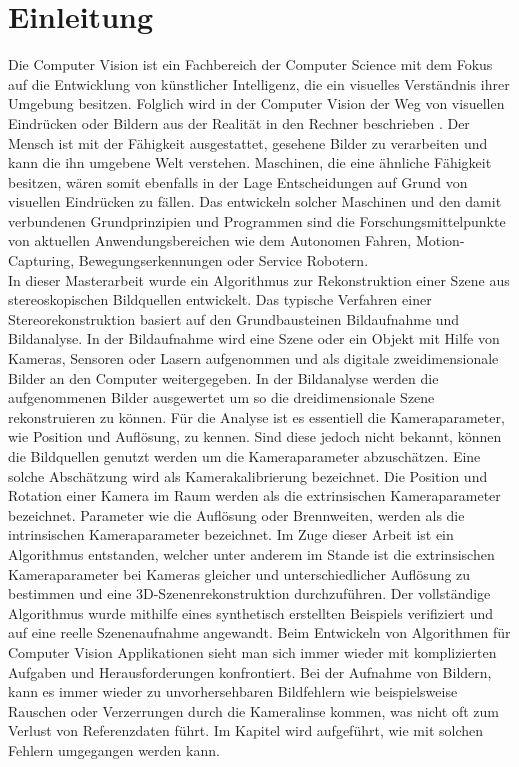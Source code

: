 \chapter{Einleitung}
\label{sec:einleitung} 




Die Computer Vision ist ein Fachbereich der Computer Science mit dem Fokus auf die Entwicklung von künstlicher Intelligenz, die ein visuelles Verständnis ihrer Umgebung besitzen. Folglich wird in der Computer Vision der Weg von visuellen Eindrücken oder Bildern aus der Realität in den Rechner beschrieben \cite{ComputerVision}. Der Mensch ist mit der Fähigkeit ausgestattet, gesehene Bilder zu verarbeiten und  kann die ihn umgebene Welt verstehen. Maschinen, die eine ähnliche Fähigkeit besitzen, wären somit ebenfalls in der Lage Entscheidungen auf Grund von visuellen Eindrücken zu fällen. Das entwickeln solcher Maschinen und den damit verbundenen Grundprinzipien und Programmen sind die Forschungsmittelpunkte von aktuellen Anwendungsbereichen wie dem Autonomen Fahren, Motion-Capturing, Bewegungserkennungen oder Service Robotern.\\

In dieser Masterarbeit wurde ein Algorithmus zur Rekonstruktion einer Szene aus stereoskopischen Bildquellen entwickelt. Das typische Verfahren einer Stereorekonstruktion basiert auf den Grundbausteinen Bildaufnahme und Bildanalyse\cite{ComputerVision}. In der Bildaufnahme wird eine Szene oder ein Objekt mit Hilfe von Kameras, Sensoren oder Lasern aufgenommen und als digitale zweidimensionale Bilder an den Computer weitergegeben. In der Bildanalyse werden die aufgenommenen Bilder ausgewertet um so die dreidimensionale Szene rekonstruieren zu können. Für die Analyse ist es essentiell die Kameraparameter, wie Position und Auflösung, zu kennen. Sind diese jedoch nicht bekannt, können die Bildquellen genutzt werden um die Kameraparameter abzuschätzen. Eine solche Abschätzung wird als Kamerakalibrierung\cite{HZ,Ferid,Elements,ZZGXr} bezeichnet. Die Position und Rotation einer Kamera im Raum werden als die extrinsischen Kameraparameter bezeichnet. Parameter wie die Auflösung oder Brennweiten, werden als die intrinsischen Kameraparameter bezeichnet\cite{HZ,Ferid}. Im Zuge dieser Arbeit ist ein Algorithmus entstanden, welcher unter anderem im Stande ist die extrinsischen Kameraparameter bei Kameras gleicher und unterschiedlicher Auflösung zu bestimmen und eine 3D-Szenenrekonstruktion durchzuführen. Der vollständige Algorithmus wurde mithilfe eines synthetisch erstellten Beispiels verifiziert und auf eine reelle Szenenaufnahme angewandt. Beim Entwickeln von Algorithmen für Computer Vision Applikationen sieht man sich immer wieder mit komplizierten Aufgaben und Herausforderungen konfrontiert. Bei der Aufnahme von Bildern, kann es immer wieder zu unvorhersehbaren Bildfehlern wie beispielsweise Rauschen oder Verzerrungen durch die Kameralinse kommen, was nicht oft zum Verlust von Referenzdaten führt. Im Kapitel  wird aufgeführt, wie mit solchen Fehlern umgegangen werden kann.\\

